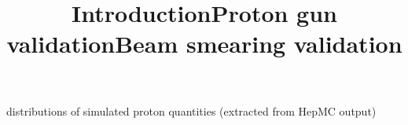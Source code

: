 \def\today{%
	\number\day
	\space
	\ifcase\month\or
	January\or February\or March\or April\or May\or June\or
	July\or August\or September\or October\or November\or December
	\fi
	\space
	\number\year
}

\newpage %

\def\author{J.~Kašpar}
\def\caption{Proton simulation validation, \PeriodLabel}
\def\date{\today}

\iffalse
* single-rp reco

* multi-rp reco
 - resolution
 - impact of misalignment
 - impact of optics systematics
\fi

\newpage %
\title{Introduction}

\iffalse
\> unless specified differently, the tests are performed with the following settings
\>> proton gun (details on slide 2)
\>>> $\xi$ distributed uniformly
\>>> $\th^*_{x, y}$: Gaussian distribution

\>> beam smearing (details on slide 3)
\>>> $x^*$, $y^*$: Gaussian distribution
\>>> $z^*$: Gaussian distribution
\>>> beam divergence: Gaussian distribution

\>> RP resolution tuned to value obtained from data (see slide 4)

\>> RP position: tuned horizontally and vertically to reproduce hit distributions in a reference LHC fill (see slides 6 to 8)

\>> aperture model: as presented in \ulink{https://indico.cern.ch/event/849095/contributions/3568020/attachments/1913799/3163250/j_kaspar_apertures.pdf}{GM on 24 Sep 2019}

\>> optics: as currently in CondDB

\>> proton reconstruction: from CMSSW 10\_6\_0
\fi

\newpage %
\title{Proton gun validation}

\SmallerFonts

\> distributions of simulated proton quantities (extracted from HepMC output)

\centerline{}



\newpage %
\title{Beam smearing validation}

